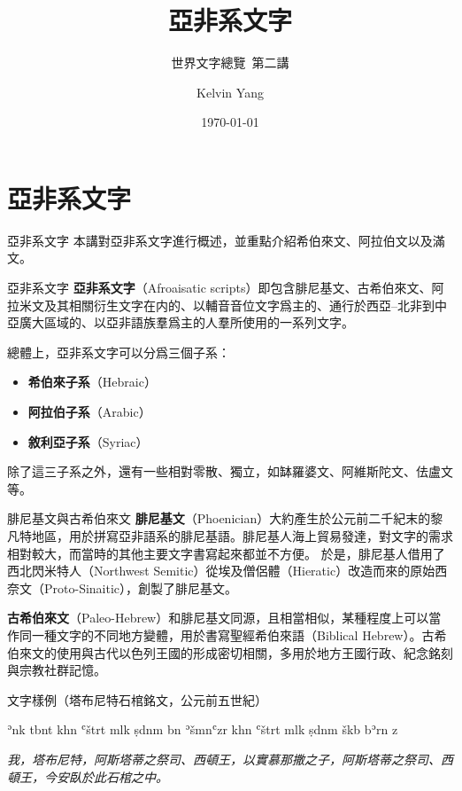 \documentclass[aspectratio=169]{beamer}
\title{亞非系文字}
\subtitle{世界文字總覽~第二講}
\author{Kelvin Yang}
\date{\today}
\begin{document}
\begin{frame}[plain]
    \titlepage
\end{frame}
\AgendaFrame

\section{亞非系文字}
\begin{frame}{亞非系文字}
    本講對亞非系文字進行概述，並重點介紹希伯來文、阿拉伯文以及滿文。

    \begin{block}{亞非系文字}
        \textbf{亞非系文字}（Afroaisatic scripts）即包含腓尼基文、古希伯來文、阿拉米文及其相關衍生文字在内的、以輔音音位文字爲主的、通行於西亞--北非到中亞廣大區域的、以亞非語族羣爲主的人羣所使用的一系列文字。
    \end{block}

    總體上，亞非系文字可以分爲三個子系：

    \begin{itemize}
        \item \textbf{希伯來子系}（Hebraic）
        \item \textbf{阿拉伯子系}（Arabic）
        \item \textbf{敘利亞子系}（Syriac）
    \end{itemize}

    除了這三子系之外，還有一些相對零散、獨立，如缽羅婆文、阿維斯陀文、佉盧文等。
\end{frame}

\begin{frame}{腓尼基文與古希伯來文}
    \textbf{腓尼基文}（Phoenician）大約產生於公元前二千紀末的黎凡特地區，用於拼寫亞非語系的腓尼基語。腓尼基人海上貿易發達，對文字的需求相對較大，而當時的其他主要文字書寫起來都並不方便。
    於是，腓尼基人借用了西北閃米特人（Northwest Semitic）從埃及僧侶體（Hieratic）改造而來的原始西奈文（Proto-Sinaitic），創製了腓尼基文。

    \textbf{古希伯來文}（Paleo-Hebrew）和腓尼基文同源，且相當相似，某種程度上可以當作同一種文字的不同地方變體，用於書寫聖經希伯來語（Biblical Hebrew）。古希伯來文的使用與古代以色列王國的形成密切相關，多用於地方王國行政、紀念銘刻與宗教社群記憶。

    \begin{block}{文字樣例（塔布尼特石棺銘文，公元前五世紀）}
        {\raggedleft
        }

        ʾnk tbnt khn ʿštrt mlk ṣdnm bn ʾšmnʿzr khn ʿštrt mlk ṣdnm škb bʾrn z

        \rmfamily\itshape
        我，塔布尼特，阿斯塔蒂之祭司、西頓王，以實慕那撒之子，阿斯塔蒂之祭司、西頓王，今安臥於此石棺之中。
    \end{block}
\end{frame}
\end{document}
